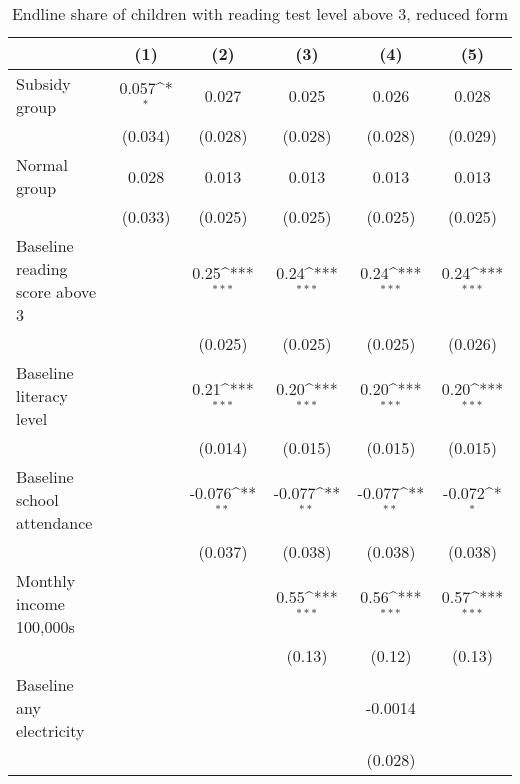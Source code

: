 \begin{table}[htbp]\centering
\def\sym#1{\ifmmode^{#1}\else\(^{#1}\)\fi}
\caption{Endline share of children with reading test level above 3, reduced form}
\begin{tabular*}{1\hsize}{@{\hskip\tabcolsep\extracolsep\fill}l*{5}{c}}
\toprule
                &\multicolumn{1}{c}{(1)}         &\multicolumn{1}{c}{(2)}         &\multicolumn{1}{c}{(3)}         &\multicolumn{1}{c}{(4)}         &\multicolumn{1}{c}{(5)}         \\
\midrule
Subsidy group   &    0.057\sym{*}  &    0.027         &    0.025         &    0.026         &    0.028         \\
                &  (0.034)         &  (0.028)         &  (0.028)         &  (0.028)         &  (0.029)         \\
Normal group    &    0.028         &    0.013         &    0.013         &    0.013         &    0.013         \\
                &  (0.033)         &  (0.025)         &  (0.025)         &  (0.025)         &  (0.025)         \\
Baseline reading score above 3&                  &     0.25\sym{***}&     0.24\sym{***}&     0.24\sym{***}&     0.24\sym{***}\\
                &                  &  (0.025)         &  (0.025)         &  (0.025)         &  (0.026)         \\
Baseline literacy level&                  &     0.21\sym{***}&     0.20\sym{***}&     0.20\sym{***}&     0.20\sym{***}\\
                &                  &  (0.014)         &  (0.015)         &  (0.015)         &  (0.015)         \\
Baseline school attendance&                  &   -0.076\sym{**} &   -0.077\sym{**} &   -0.077\sym{**} &   -0.072\sym{*}  \\
                &                  &  (0.037)         &  (0.038)         &  (0.038)         &  (0.038)         \\
Monthly income 100,000s&                  &                  &     0.55\sym{***}&     0.56\sym{***}&     0.57\sym{***}\\
                &                  &                  &   (0.13)         &   (0.12)         &   (0.13)         \\
Baseline any electricity&                  &                  &                  &  -0.0014         &                  \\
                &                  &                  &                  &  (0.028)         &                  \\

\end{tabular*}
\end{table}
